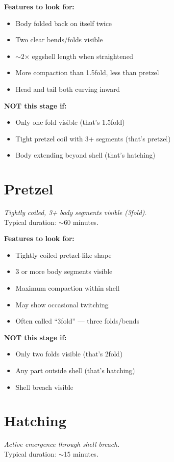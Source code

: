 \documentclass[11pt,letterpaper]{article}
\begin{document}
\textbf{Features to look for:}
\begin{itemize}
    \item Body folded back on itself twice
    \item Two clear bends/folds visible
    \item $\sim$2$\times$ eggshell length when straightened
    \item More compaction than 1.5fold, less than pretzel
    \item Head and tail both curving inward
\end{itemize}

\textbf{NOT this stage if:}
\begin{itemize}
    \item Only one fold visible (that's 1.5fold)
    \item Tight pretzel coil with 3+ segments (that's pretzel)
    \item Body extending beyond shell (that's hatching)
\end{itemize}

\section{Pretzel}
\textit{Tightly coiled, 3+ body segments visible (3fold).}\\
Typical duration: $\sim$60 minutes.

\textbf{Features to look for:}
\begin{itemize}
    \item Tightly coiled pretzel-like shape
    \item 3 or more body segments visible
    \item Maximum compaction within shell
    \item May show occasional twitching
    \item Often called ``3fold'' --- three folds/bends
\end{itemize}

\textbf{NOT this stage if:}
\begin{itemize}
    \item Only two folds visible (that's 2fold)
    \item Any part outside shell (that's hatching)
    \item Shell breach visible
\end{itemize}

\section{Hatching}
\textit{Active emergence through shell breach.}\\
Typical duration: $\sim$15 minutes.
\end{document}
